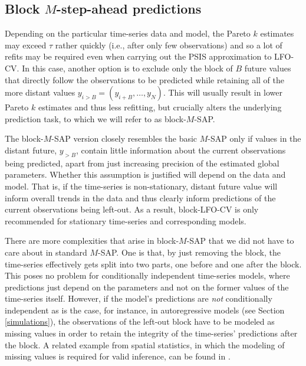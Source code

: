 \documentclass[american,]{article}
\begin{document}
\hypertarget{approximate_blockMSAP}{%
\subsection{\texorpdfstring{Block \(M\)-step-ahead predictions}{Block M-step-ahead predictions}}\label{approximate_blockMSAP}}

Depending on the particular time-series data and model, the Pareto \(k\) estimates
may exceed \(\tau\) rather quickly (i.e., after only few observations) and so
a lot of refits may be required even when carrying out the PSIS approximation
to LFO-CV. In this case, another option is to exclude only the block of \(B\)
future values that directly follow the observations to be predicted while
retaining all of the more distant values \(y_{i>B} = (y_{i + B}, \ldots, y_N)\).
This will usually result in lower Pareto \(k\) estimates and thus less refitting,
but crucially alters the underlying prediction task, to which we will refer
to as block-\(M\)-SAP.

The block-\(M\)-SAP version closely resembles the basic \(M\)-SAP only if values in
the distant future, \(y_{>B}\), contain little information about the current
observations being predicted, apart from just increasing precision of the
estimated global parameters. Whether this assumption is justified will depend
on the data and model. That is, if the time-series is non-stationary, distant
future value will inform overall trends in the data and thus clearly inform
predictions of the current observations being left-out. As a result,
block-LFO-CV is only recommended for stationary time-series and corresponding
models.

There are more complexities that arise in block-\(M\)-SAP that we did not have to
care about in standard \(M\)-SAP. One is that, by just removing the block, the
time-series effectively gets split into two parts, one before and one after the
block. This poses no problem for conditionally independent time-series models,
where predictions just depend on the parameters and not on the former values of
the time-series itself. However, if the model's predictions are \emph{not}
conditionally independent as is the case, for instance, in autoregressive models
(see Section \ref{simulations}), the observations of the left-out block have to
be modeled as missing values in order to retain the integrity of the
time-series' predictions after the block. A related example from spatial
statistics, in which the modeling of missing values is required for valid
inference, can be found in \citet{buerkner:non-factorizable}.
\end{document}
